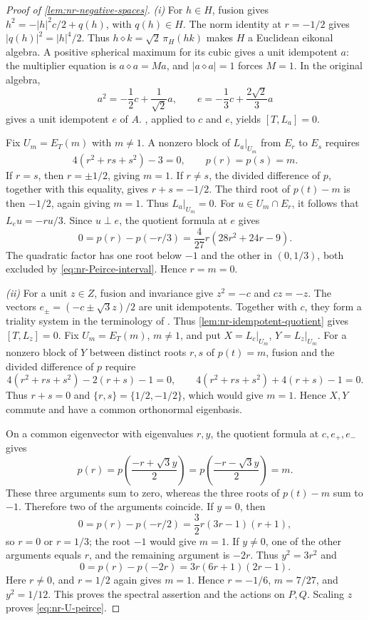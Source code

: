 \begin{proof}[Proof of \cref{lem:nr-negative-spaces}]
\emph{(i)} For \(h\in H\), fusion gives
\(h^2=-|h|^2c/2+q(h)\), with \(q(h)\in H\).
The norm identity at \(r=-1/2\) gives
\(|q(h)|^2=|h|^4/2\). Thus
\(h\diamond k=\sqrt2\,\pi_H(hk)\) makes \(H\) a Euclidean
eikonal algebra. A positive spherical maximum for its cubic gives a
unit idempotent \(a\): the multiplier equation is
\(a\diamond a=Ma\), and \(|a\diamond a|=1\) forces \(M=1\).
In the original algebra,
\[
 a^2=-\frac12c+\frac1{\sqrt2}a,\qquad
 e=-\frac13c+\frac{2\sqrt2}{3}a
\]
gives a unit idempotent \(e\) of \(A\).
, applied to \(c\) and \(e\),
yields \([T,L_a]=0\).

Fix \(U_m=E_T(m)\) with \(m\ne1\).
A nonzero block of \(L_a|_{U_m}\) from \(E_r\) to \(E_s\) requires
\[
 4(r^2+rs+s^2)-3=0,\qquad p(r)=p(s)=m.
\]
If \(r=s\), then \(r=\pm1/2\), giving \(m=1\).
If \(r\ne s\), the divided difference of \(p\), together with
this equality, gives \(r+s=-1/2\). The third root of
\(p(t)-m\) is then \(-1/2\), again giving \(m=1\).
Thus \(L_a|_{U_m}=0\). For \(u\in U_m\cap E_r\), it follows
that \(L_eu=-ru/3\). Since \(u\perp e\), the quotient formula
at \(e\) gives
\[
 0=p(r)-p(-r/3)=\frac4{27}r(28r^2+24r-9).
\]
The quadratic factor has one root below \(-1\) and the other in
\((0,1/3)\), both excluded by \eqref{eq:nr-Peirce-interval}.
Hence \(r=m=0\).

\emph{(ii)} For a unit \(z\in Z\), fusion and invariance give \(z^2=-c\)
and \(cz=-z\). The vectors \(e_\pm=(-c\pm\sqrt3z)/2\)
are unit idempotents.
Together with \(c\), they form a triality system in the terminology of
\cite[Definition~6.8.1]{NadirashviliTkachevVladut14}.
Thus \cref{lem:nr-idempotent-quotient} gives \([T,L_z]=0\).
Fix \(U_m=E_T(m)\), \(m\ne1\), and put
\(X=L_c|_{U_m}\), \(Y=L_z|_{U_m}\).
For a nonzero block of \(Y\) between distinct roots \(r,s\) of
\(p(t)=m\), fusion and the divided difference of \(p\) require
\[
 4(r^2+rs+s^2)-2(r+s)-1=0,\qquad
 4(r^2+rs+s^2)+4(r+s)-1=0.
\]
Thus \(r+s=0\) and \(\{r,s\}=\{1/2,-1/2\}\), which would
give \(m=1\). Hence \(X,Y\) commute and have a common
orthonormal eigenbasis.

On a common eigenvector with eigenvalues \(r,y\), the quotient
formula at \(c,e_+,e_-\) gives
\[
 p(r)=p\left(\frac{-r+\sqrt3y}{2}\right)
     =p\left(\frac{-r-\sqrt3y}{2}\right)=m.
\]
These three arguments sum to zero, whereas the three roots of
\(p(t)-m\) sum to \(-1\). Therefore two of the arguments coincide.
If \(y=0\), then
\[
 0=p(r)-p(-r/2)=\frac32r(3r-1)(r+1),
\]
so \(r=0\) or \(r=1/3\); the root \(-1\) would give \(m=1\).
If \(y\ne0\), one of the other arguments equals \(r\), and the
remaining argument is \(-2r\). Thus \(y^2=3r^2\) and
\[
 0=p(r)-p(-2r)=3r(6r+1)(2r-1).
\]
Here \(r\ne0\), and \(r=1/2\) again gives \(m=1\). Hence
\(r=-1/6\), \(m=7/27\), and \(y^2=1/12\).
This proves the spectral assertion and the actions on \(P,Q\).
Scaling \(z\) proves \eqref{eq:nr-U-peirce}.
\end{proof}

